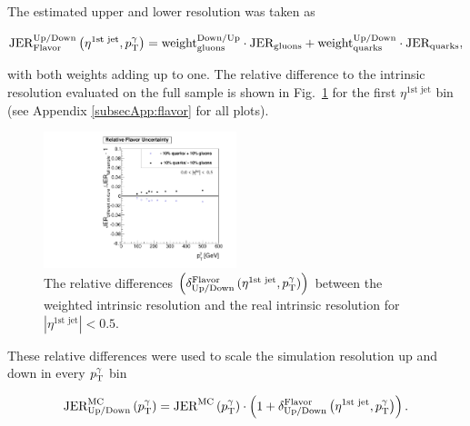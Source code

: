 The estimated upper and lower resolution was taken as

\begin{equation}
\label{FlavorError}
 \text{JER}^{\text{Up/Down}}_{\text{Flavor}} \left(\eta^{\text{1st jet}},p_{\text{T}}^{\gamma} \right) = \text{weight}^{\text{Down/Up}}_{\text{gluons}}\cdot\text{JER}_\text{gluons} +  \text{weight}^{\text{Up/Down}}_{\text{quarks}}\cdot\text{JER}_\text{quarks},  
\end{equation}
 
with both weights adding up to one.
The relative difference to the intrinsic resolution evaluated on the full sample is shown in \mbox{Fig. \ref{fig:FlavorUncertainty}} for the first $\eta^{\text{1st jet}}$ bin 
(see Appendix \ref{subsecApp:flavor} for all plots).
\begin{figure}[b]
  \centering

      \includegraphics[width=0.50\textwidth]{figures/resolution/systematicUncertainties/Relative_Resolution_for_1_eta_bin_FlavorUncertainty_RMS99_mixture.pdf}
 
  \caption{The relative differences $\left( \delta^{\text{Flavor}}_{\text{Up/Down}}  \left(\eta^{\text{1st jet}},p_{\text{T}}^{\gamma} \right)\right)$ 
           between the weighted intrinsic resolution and the real intrinsic resolution for $|\eta^{\text{1st jet}}| < 0.5$.}  
  \label{fig:FlavorUncertainty}
\end{figure}  
These relative differences were used to scale the simulation resolution up and down in every $p_{\text{T}}^{\gamma}$ bin

\begin{equation}
\label{FlavorUpDown}
\text{JER}^{\text{MC}}_{\text{Up/Down}} \left(p_{\text{T}}^{\gamma} \right) = \text{JER}^{\text{MC}} \left(p_{\text{T}}^{\gamma} \right) \cdot \left(1 + \delta^{\text{Flavor}}_{\text{Up/Down}}  \left(\eta^{\text{1st jet}},p_{\text{T}}^{\gamma} \right) \right).
\end{equation}

